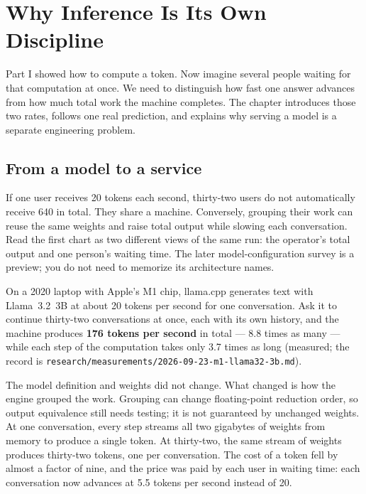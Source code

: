 \chapter{Why Inference Is Its Own Discipline}\label{ch:why-inference}

\begin{ChapterIntent}
Part I showed how to compute a token. Now imagine several people waiting for that
computation at once. We need to distinguish how fast one answer advances from how much
total work the machine completes. The chapter introduces those two rates, follows one
real prediction, and explains why serving a model is a separate engineering problem.
\end{ChapterIntent}

\section*{From a model to a service}
If one user receives 20 tokens each second, thirty-two users do not automatically
receive 640 in total. They share a machine. Conversely, grouping their work can reuse
the same weights and raise total output while slowing each conversation. Read the first
chart as two different views of the same run: the operator's total output and one
person's waiting time. The later model-configuration survey is a preview; you do not
need to memorize its architecture names.


On a 2020 laptop with Apple's M1 chip, llama.cpp generates text with
Llama~3.2~3B at about 20 tokens per second for one conversation. Ask it to
continue thirty-two conversations at once, each with its own history, and the
machine produces \textbf{176 tokens per second} in total --- 8.8 times as many
--- while each step of the computation takes only 3.7 times as long (measured;
the record is \texttt{research/measurements/2026-09-23-m1-llama32-3b.md}).

The model definition and weights did not change. What changed is how the
engine grouped the work. Grouping can change floating-point reduction order,
so output equivalence still needs testing; it is not guaranteed by unchanged
weights. At
one conversation, every step streams all two gigabytes of weights from memory
to produce a single token. At thirty-two, the same stream of weights produces
thirty-two tokens, one per conversation. The cost of a token fell by almost a
factor of nine, and the price was paid by each user in waiting time: each
conversation now advances at 5.5 tokens per second instead of 20.

